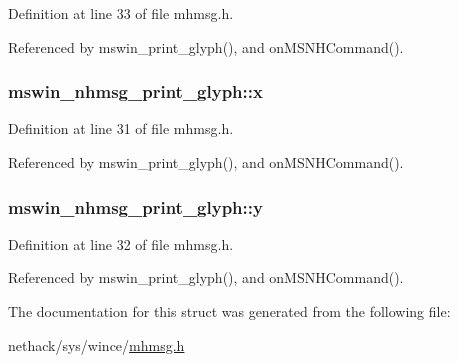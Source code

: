 Definition at line 33 of file mhmsg.\+h.



Referenced by mswin\+\_\+print\+\_\+glyph(), and on\+M\+S\+N\+H\+Command().

\hypertarget{structmswin__nhmsg__print__glyph_a78882344ead9571272a05592dd30142b}{
\subsubsection[{x}]{ mswin\+\_\+nhmsg\+\_\+print\+\_\+glyph\+::x}}\label{structmswin__nhmsg__print__glyph_a78882344ead9571272a05592dd30142b}


Definition at line 31 of file mhmsg.\+h.



Referenced by mswin\+\_\+print\+\_\+glyph(), and on\+M\+S\+N\+H\+Command().

\hypertarget{structmswin__nhmsg__print__glyph_a50e05842f25a1ae67f16ecba99cd0def}{
\subsubsection[{y}]{ mswin\+\_\+nhmsg\+\_\+print\+\_\+glyph\+::y}}\label{structmswin__nhmsg__print__glyph_a50e05842f25a1ae67f16ecba99cd0def}


Definition at line 32 of file mhmsg.\+h.



Referenced by mswin\+\_\+print\+\_\+glyph(), and on\+M\+S\+N\+H\+Command().



The documentation for this struct was generated from the following file\+:\begin{DoxyCompactItemize}
\item 
nethack/sys/wince/\hyperlink{sys_2wince_2mhmsg_8h}{mhmsg.\+h}\end{DoxyCompactItemize}
